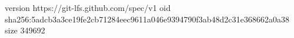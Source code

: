 version https://git-lfs.github.com/spec/v1
oid sha256:5adcb3a3ce19fe2cb71284eec9611a046e9394790f3ab48d2c31e368662a0a38
size 349692
